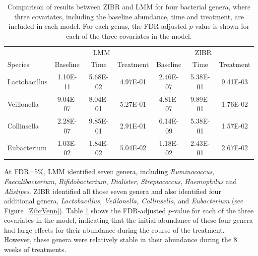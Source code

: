 \begin{table}[tb]
\begin{center}
\caption[Comparison of results between ZIBR and LMM for four bacterial genera]{Comparison of results between ZIBR and LMM for four bacterial genera, where three covariates, including the baseline abundance, time and treatment, are included in each model. For each genus, the FDR-adjusted $p$-value is shown for each of the three covariates in the model. }\label{tbl2}
\begin{tabular}{lcccccc}
\hline
\multicolumn{1}{l}{} & 	\multicolumn{3}{c}{LMM} & 		\multicolumn{3}{c}{ZIBR}\\		
Species	 &Baseline	&Time	&Treatment &	Baseline&	Time&	Treatment\\
\hline
Lactobacillus&	1.10E-11	&5.68E-02	&4.97E-01	&2.46E-07	&5.38E-01	&9.41E-03\\
Veillonella	&9.04E-07	&8.04E-01	&5.27E-01	&4.81E-07	&9.89E-01	&1.76E-02\\
Collinsella	&2.28E-07	&9.85E-01	&2.91E-01	&6.14E-09	&5.38E-01	&1.57E-02\\
Eubacterium&	1.03E-02&	1.84E-02&	5.04E-02&	1.18E-02&	2.43E-01&	2.67E-02\\
\hline
\end{tabular}
\end{center}
\end{table}

At FDR=5\%, LMM identified  seven genera, including {\it Ruminococcus}, {\it  Faecalibacterium},  {\it Bifidobacterium}, {\it Dialister}, {\it  Streptococcus}, {\it  Haemophilus} and  {\it  Alistipes}. ZIBR identified all those seven genera and also identified four additional genera, {\it Lactobacillus, Veillonella, Collinsella}, and {\it Eubacterium} (see Figure~\ref{ZibrVenn}). Table \ref{tbl2} shows the FDR-adjusted $p$-value  for each of the three covariates in the model, indicating that the initial abundance of these four genera had large effects for their abundance during the course of the treatment. However, these genera were relatively stable in their abundance during the 8 weeks of treatments. 


